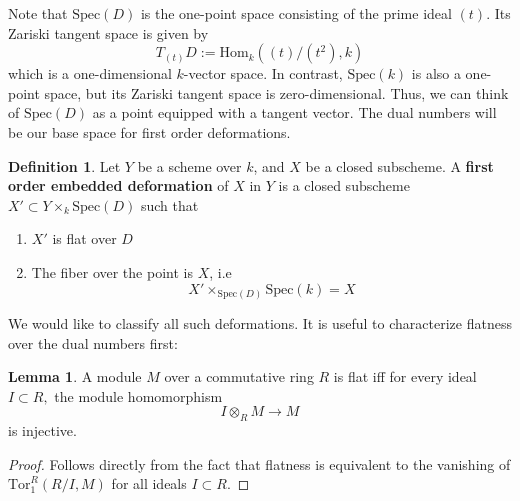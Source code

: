 \documentclass{article}
\newcommand{\Spec}{\textrm{Spec}}
\newcommand{\Hom}{\textrm{Hom}}
\theoremstyle{definition}
\theoremstyle{definition}
\newtheorem{definition}{Definition}[theorem]
\theoremstyle{definition}
\theoremstyle{definition}
\theoremstyle{definition}
\newtheorem{lemma}[theorem]{Lemma}
\theoremstyle{definition}
\theoremstyle{definition}
\begin{document}
Note that $\Spec(D)$ is the one-point space consisting of the prime ideal $(t)$. Its Zariski tangent space is given by 
\[T_{(t)}D:= \Hom_k ((t)/(t^2),k) \]
which is a one-dimensional $k$-vector space. In contrast, $\Spec(k)$ is also a one-point space, but its Zariski tangent space is zero-dimensional. Thus, we can think of $\Spec(D)$ as a point equipped with a tangent vector. The dual numbers will be our base space for first order deformations.


\begin{definition}
	\label{deformation_def}
	Let $Y$ be a scheme over $k$, and $X$ be a closed subscheme. A \textbf{first order embedded deformation} of $X$ in $Y$ is a closed subscheme $X'\subset Y\times_k \Spec (D)$ such that 
	\begin{enumerate}
		\item $X'$ is flat over $D$
		\item The fiber over the point is $X$, i.e 
		\[X'\times_{\Spec(D)}\Spec(k)= X\]
	\end{enumerate}
\end{definition}

We would like to classify all such deformations. It is useful to characterize flatness over the dual numbers first: 

\begin{lemma}
	\label{flatness_criterion}
	A module $M$ over a commutative ring $R$ is flat iff for every ideal $I\subset R,$ the module homomorphism 
	\[I\otimes_R M\to M\]
	is injective.
\end{lemma}
\begin{proof}
	Follows directly from the fact that flatness is equivalent to the vanishing of $\mathrm{Tor}_1^R(R/I, M)$ for all ideals $I\subset R$.
\end{proof}
\end{document}
